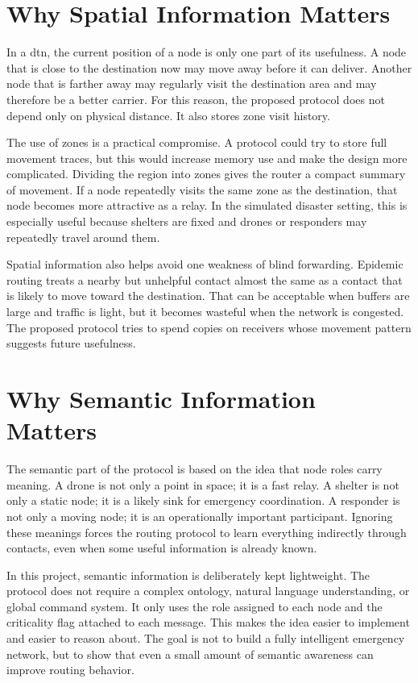 \section{Why Spatial Information Matters}
In a \ac{dtn}, the current position of a node is only one part of its usefulness. A node that is close to the destination now may move away before it can deliver. Another node that is farther away may regularly visit the destination area and may therefore be a better carrier. For this reason, the proposed protocol does not depend only on physical distance. It also stores zone visit history.

The use of zones is a practical compromise. A protocol could try to store full movement traces, but this would increase memory use and make the design more complicated. Dividing the region into zones gives the router a compact summary of movement. If a node repeatedly visits the same zone as the destination, that node becomes more attractive as a relay. In the simulated disaster setting, this is especially useful because shelters are fixed and drones or responders may repeatedly travel around them.

Spatial information also helps avoid one weakness of blind forwarding. Epidemic routing treats a nearby but unhelpful contact almost the same as a contact that is likely to move toward the destination. That can be acceptable when buffers are large and traffic is light, but it becomes wasteful when the network is congested. The proposed protocol tries to spend copies on receivers whose movement pattern suggests future usefulness.

\section{Why Semantic Information Matters}
The semantic part of the protocol is based on the idea that node roles carry meaning. A drone is not only a point in space; it is a fast relay. A shelter is not only a static node; it is a likely sink for emergency coordination. A responder is not only a moving node; it is an operationally important participant. Ignoring these meanings forces the routing protocol to learn everything indirectly through contacts, even when some useful information is already known.

In this project, semantic information is deliberately kept lightweight. The protocol does not require a complex ontology, natural language understanding, or global command system. It only uses the role assigned to each node and the criticality flag attached to each message. This makes the idea easier to implement and easier to reason about. The goal is not to build a fully intelligent emergency network, but to show that even a small amount of semantic awareness can improve routing behavior.

